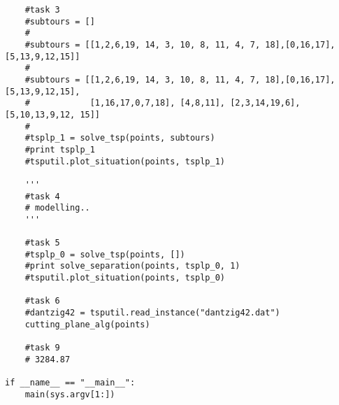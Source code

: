 \documentclass[a4paper,10pt]{article}
\begin{document}
\begin{lstlisting}
    #task 3
    #subtours = []
    #
    #subtours = [[1,2,6,19, 14, 3, 10, 8, 11, 4, 7, 18],[0,16,17],[5,13,9,12,15]]
    #
    #subtours = [[1,2,6,19, 14, 3, 10, 8, 11, 4, 7, 18],[0,16,17],[5,13,9,12,15],
    #            [1,16,17,0,7,18], [4,8,11], [2,3,14,19,6], [5,10,13,9,12, 15]]
    #
    #tsplp_1 = solve_tsp(points, subtours)
    #print tsplp_1
    #tsputil.plot_situation(points, tsplp_1)

    '''
    #task 4
    # modelling..
    '''

    #task 5
    #tsplp_0 = solve_tsp(points, [])
    #print solve_separation(points, tsplp_0, 1)
    #tsputil.plot_situation(points, tsplp_0)

    #task 6
    #dantzig42 = tsputil.read_instance("dantzig42.dat")
    cutting_plane_alg(points)

    #task 9
    # 3284.87

if __name__ == "__main__":
    main(sys.argv[1:])
\end{lstlisting}
\end{document}
